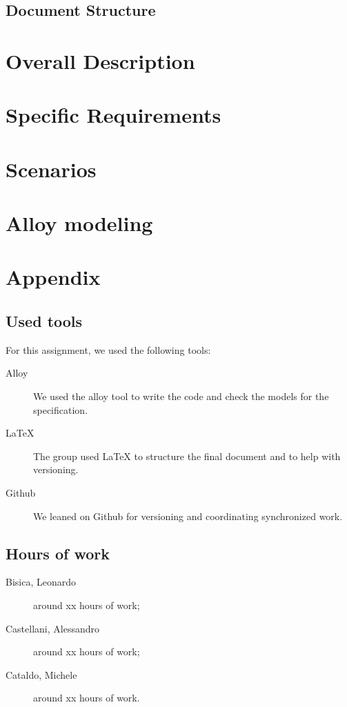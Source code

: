 \documentclass[12pt, a4paper]{article}
\begin{document}
		\subsection{Document Structure}	
			


	\newpage
	\section{Overall Description}
		


	\newpage
	\section{Specific Requirements}
		

	\newpage
	\section{Scenarios}
		


	\newpage
	\section{Alloy modeling}


	\newpage	
	\section{Appendix}
		\listoffigures
		\listoftables
		
		\subsection{Used tools}
		For this assignment, we used the following tools:
		
		\begin{description}
			\item [Alloy] We used the alloy tool to write the code and check the models for the specification.
			\item [LaTeX] The group used LaTeX to structure the final document and to help with versioning.
			\item [Github] We leaned on Github for versioning and coordinating synchronized work.
			
		\end{description}
		
		\subsection{Hours of work}
			\begin{description}
				\item[Bisica, Leonardo] around xx hours of work;
				\item[Castellani, Alessandro] around xx hours of work;
				\item[Cataldo, Michele] around xx hours of work.
			\end{description}
			
\end{document}
